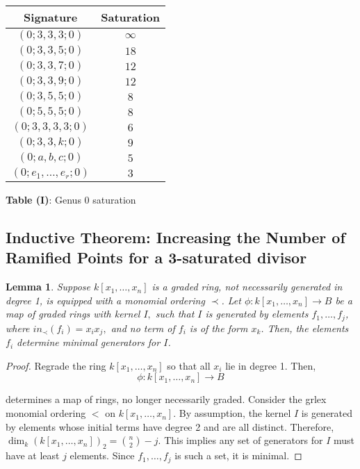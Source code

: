 \documentclass{amsart}
\theoremstyle{plain}
\newtheorem{lem}[thm]{Lemma}
\theoremstyle{definition}
\theoremstyle{remark}
\numberwithin{equation}{section}
\newcommand\ssec{\subsection}
\begin{document}
\begin{longtable}
	{| c | c |}
	\hline
	Signature & Saturation \\
	\hline
	\hline

	$(0; 3, 3, 3; 0)$ & $\infty$ \\	\hline

	$(0; 3, 3, 5; 0)$ & $18$ \\	\hline
	
	$(0; 3, 3, 7; 0)$ & $12$ \\	\hline
	
	$(0; 3, 3, 9; 0)$ & $12$ \\	\hline
	
	$(0; 3, 5, 5; 0)$ & $8$ \\	\hline
	
	$(0; 5, 5, 5; 0)$ & $8$ \\	\hline
	
	$(0; 3, 3, 3, 3; 0)$ & $6$ \\	\hline
	
	\hline
	
	$(0; 3, 3, k; 0)$ & $9$ \\	\hline
	
	$(0; a, b, c; 0)$ & $5$ \\	\hline
	
	$(0; e_1, \ldots, e_r; 0)$ & $3$ \\	\hline
\end{longtable}

\begin{center}
\textbf{Table (I)}: Genus 0 saturation
\end{center}

\ssec{Inductive Theorem: Increasing the Number of Ramified Points for a 3-saturated divisor}
\label{ssec:g_0_ram_pts}

\begin{lem}
\label{lem:minimal_quadratic}
Suppose $k[x_1,\ldots, x_n]$ is a graded ring, not necessarily
generated in degree 1, is equipped with a monomial ordering $\prec$.
 Let $\phi:k[x_1,\ldots, x_n] \rightarrow B$ be a map of graded
rings with kernel $I,$ such that $I$ is generated by elements $f_1,
\ldots, f_j$, where $in_\prec(f_i) = x_ix_j,$ and no term of $f_i$
is of the form $x_k$. Then, the elements $f_i$ determine minimal
generators for $I$.
\end{lem}

\begin{proof}
Regrade the ring $k[x_1, \ldots, x_n]$ so that all $x_i$ lie in
degree 1. Then,
\[
	\phi : k[x_1, \ldots, x_n] \rightarrow B
\]

\noindent
determines a map of rings, no longer necessarily graded. Consider
the grlex monomial ordering $<$ on $k[x_1, \ldots, x_n]$.
By
assumption, the kernel $I$ is generated by elements whose initial
terms have degree 2 and are all distinct. Therefore, $\dim_k (k[x_1,
\ldots, x_n])_2 = \binom{n}{2}-j.$ This implies any set of
generators for $I$ must have at least $j$ elements. Since $f_1,
\ldots, f_j$ is such a set, it is minimal.
\end{proof}
\end{document}
